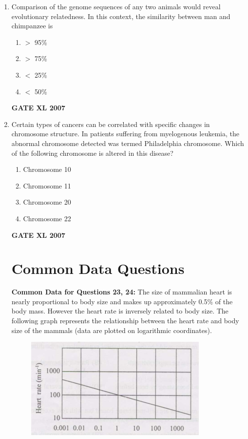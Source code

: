 \documentclass[journal,12pt,onecolumn]{IEEEtran}
\begin{document}
\begin{enumerate}
\item Comparison of the genome sequences of any two animals would reveal evolutionary relatedness. In this context, the similarity between man and chimpanzee is
\begin{enumerate}
    \item $>$ 95\%
    \item $>$ 75\%
    \item $<$ 25\%
    \item $<$ 50\%
\end{enumerate}\hfill{\textbf{GATE XL 2007}}

\item Certain types of cancers can be correlated with specific changes in chromosome structure. In patients suffering from myelogenous leukemia, the abnormal chromosome detected was termed Philadelphia chromosome. Which of the following chromosome is altered in this disease?
\begin{enumerate}
    \item Chromosome 10
    \item Chromosome 11
    \item Chromosome 20
    \item Chromosome 22
\end{enumerate}\hfill{\textbf{GATE XL 2007}}

\vspace{2em}
\section*{Common Data Questions}
\textbf{Common Data for Questions 23, 24:}
The size of mammalian heart is nearly proportional to body size and makes up approximately 0.5\% of the body mass. However the heart rate is inversely related to body size. The following graph represents the relationship between the heart rate and body size of the mammals (data are plotted on logarithmic coordinates).
\begin{figure}[h!]
	\centering
	\includegraphics[width=\columnwidth]{23.png}
	\caption*{}
	\label{fig:Q23}
	\end{figure}


\end{enumerate}
\end{document}
